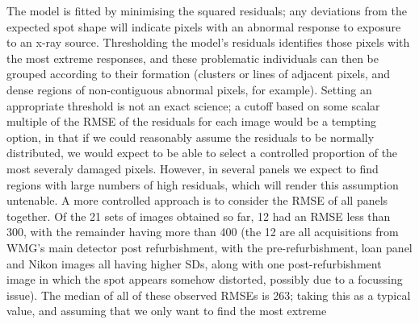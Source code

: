 \documentclass[\main/IO-Pixels.tex]{subfiles}
\begin{document}

The model is fitted by minimising the squared residuals; any deviations from the expected spot shape will indicate pixels with an abnormal response to exposure to an x-ray source. Thresholding the model's residuals identifies those pixels with the most extreme responses, and these problematic individuals can then be grouped according to their formation (clusters or lines of adjacent pixels, and dense regions of non-contiguous abnormal pixels, for example). Setting an appropriate threshold is not an exact science; a cutoff based on some scalar multiple of the RMSE of the residuals for each image would be a tempting option, in that if we could reasonably assume the residuals to be normally distributed, we would expect to be able to select a controlled proportion of the most severaly damaged pixels. However, in several panels we expect to find regions with large numbers of high residuals, which will render this assumption untenable. A more controlled approach is to consider the RMSE of all panels together. Of the 21 sets of images obtained so far, 12 had an RMSE less than 300, with the remainder having more than 400 (the 12 are all acquisitions from WMG's main detector post refurbishment, with the pre-refurbishment, loan panel and Nikon images all having higher SDs, along with one post-refurbishment image in which the spot appears somehow distorted, possibly due to a focussing issue). The median of all of these observed RMSEs is 263; taking this as a typical value, and assuming that we only want to find the most extreme 


\end{document}
